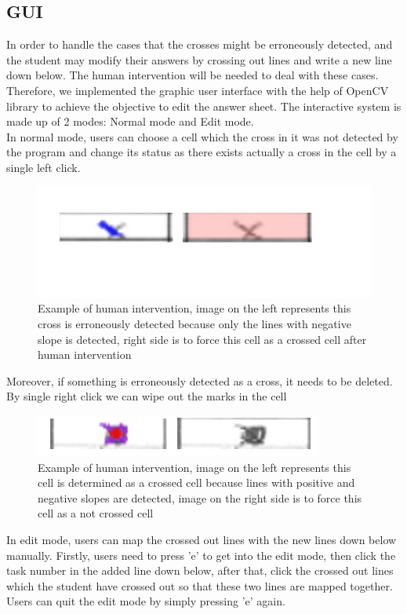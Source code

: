 \documentclass[a4paper,twoside]{article}
\begin{document}
\subsection{GUI}
In order to handle the cases that the crosses might be erroneously detected, and the student may modify their answers by crossing out lines and write a new line down below. The human intervention will be needed to deal with these cases. Therefore, we implemented the graphic user interface with the help of OpenCV library to achieve the objective to edit the answer sheet. The interactive system is made up of 2 modes: Normal mode and Edit mode.\\
In normal mode, users can choose a cell which the cross in it was not detected by the program and change its status as there exists actually a cross in the cell by a single left click.
\begin{figure}[!h]
  \centering
  \includegraphics[width=0.8\columnwidth]{Latex/imgs/gui_1.PNG}
  \caption{Example of human intervention, image on the left represents this cross is erroneously detected because only the lines with negative slope  is detected, right side is to force this cell as a crossed cell after human intervention}
  \label{fig: gui_1}
 \end{figure}
 Moreover, if something is erroneously detected as a cross, it needs to be deleted. By single right click we can wipe out the marks in the cell
 \begin{figure}[!h]
  \centering
  \includegraphics[width=0.8\columnwidth]{Latex/imgs/gui_2.PNG}
  \caption{Example of human intervention, image on the left represents this cell is determined as a crossed cell because lines with positive and negative slopes are detected, image on the right side is to force this cell as a not crossed cell}
  \label{fig: gui_2}
 \end{figure}
In edit mode, users can map the crossed out lines with the new lines down below manually. Firstly, users need to press 'e' to get into the edit mode, then click the task number in the added line down below, after that, click the crossed out lines which the student have crossed out so that these two lines are mapped together. Users can quit the edit mode by simply pressing 'e' again.
\end{document}

